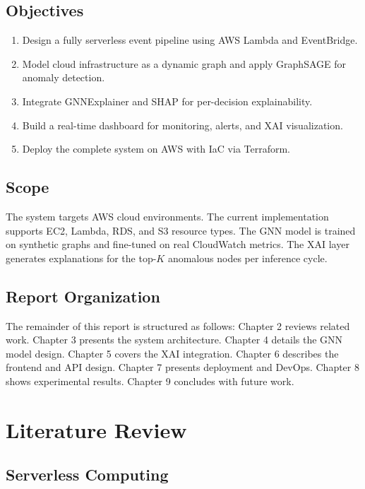 \documentclass[12pt,a4paper]{report}
\begin{document}
\section{Objectives}

\begin{enumerate}
  \item Design a fully serverless event pipeline using AWS Lambda and
        EventBridge.
  \item Model cloud infrastructure as a dynamic graph and apply GraphSAGE
        for anomaly detection.
  \item Integrate GNNExplainer and SHAP for per-decision explainability.
  \item Build a real-time dashboard for monitoring, alerts, and
        XAI visualization.
  \item Deploy the complete system on AWS with IaC via Terraform.
\end{enumerate}

\section{Scope}

The system targets AWS cloud environments. The current implementation
supports EC2, Lambda, RDS, and S3 resource types. The GNN model is trained
on synthetic graphs and fine-tuned on real CloudWatch metrics. The XAI
layer generates explanations for the top-$K$ anomalous nodes per inference
cycle.

\section{Report Organization}

The remainder of this report is structured as follows:
Chapter 2 reviews related work. Chapter 3 presents the system architecture.
Chapter 4 details the GNN model design. Chapter 5 covers the XAI
integration. Chapter 6 describes the frontend and API design. Chapter 7
presents deployment and DevOps. Chapter 8 shows experimental results.
Chapter 9 concludes with future work.

\chapter{Literature Review}

\section{Serverless Computing}
\end{document}
